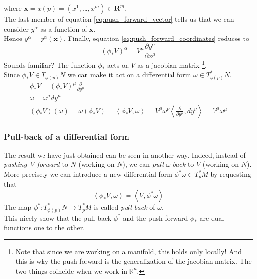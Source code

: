 \documentclass{article}
\begin{document}
where $\textbf{x} = x(p) = (x^1, \dots, x^m) \in \mathbf{R}^m$. \\
The last member of equation \ref{eq:push_forward_vector} tells us that we can consider $y^\alpha$ as a function of $\mathbf{x}$. \\
Hence $y^\alpha = y^{\alpha}(\mathbf{x})$. Finally, equation \ref{eq:push_forward_coordinates} reduces to 
\begin{equation*}
    (\phi_* V)^\alpha = V^\mu \frac{\partial y^\alpha}{\partial x^\mu}
\end{equation*}
Sounds familiar? The function $\phi_*$ acts on $V$ as a jacobian matrix \footnote{Note that since we are working on a manifold, this holds only locally! And this is why the push-forward is the generalization of the jacobian matrix. The two things coincide when we work in $\mathbb{R}^n$.}. \\
Since $\phi_* V \in T_{\phi(p)}N$ we can make it act on a differential form $\omega \in T_{\phi(p)}^*N$.
\begin{gather*}
    \phi_* V = (\phi_*V)^\mu \frac{\partial}{\partial y^\mu} \\
    \omega = \omega^\mu dy^\mu \\
    (\phi_* V)(\omega) = \omega(\phi_*V) = \left\langle \phi_*V, \omega \right\rangle = V^\mu \omega^\nu \left\langle\frac{\partial}{\partial y^\mu}, dy^\nu \right\rangle = V^\mu \omega^\mu
\end{gather*}

\subsubsection*{Pull-back of a differential form}
The result we have just obtained can be seen in another way. Indeed, instead of \emph{pushing V forward} to $N$ (working on $N$), we can \emph{pull $\omega$ back} to $V$ (working on $N$). More precisely
we can introduce a new differential form $\phi^*\omega \in T_p^* M$ by requesting that
\begin{equation*}
    \left\langle \phi_* V, \omega \right\rangle = \left\langle V, \phi^*\omega \right\rangle
\end{equation*}
The map $\phi^* : T_{\phi(p)}^* N \to T_p^* M$ is called \emph{pull-back} of $\omega$. \\
This nicely show that the pull-back $\phi^*$ and the push-forward $\phi_*$ are dual functions one to the other.
\end{document}
